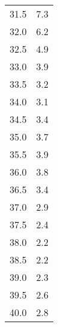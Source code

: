 \begin{table}
\begin{tabular}{S[]S[]}
31.5 & 7.3\\
32.0 & 6.2\\
32.5 & 4.9\\
33.0 & 3.9\\
33.5 & 3.2\\
34.0 & 3.1\\
34.5 & 3.4\\
35.0 & 3.7\\
35.5 & 3.9\\
36.0 & 3.8\\
36.5 & 3.4\\
37.0 & 2.9\\
37.5 & 2.4\\
38.0 & 2.2\\
38.5 & 2.2\\
39.0 & 2.3\\
39.5 & 2.6\\
40.0 & 2.8\\
\bottomrule
\end{tabular}\end{table}